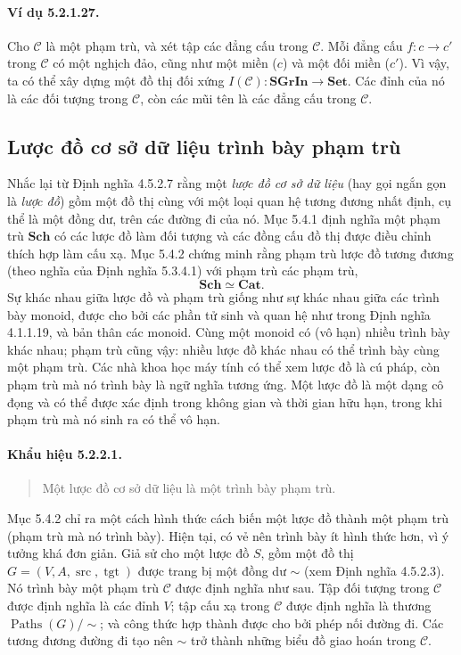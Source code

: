 \paragraph{Ví dụ 5.2.1.27.} Cho $\mathcal C$ là một phạm trù, và xét tập các đẳng cấu trong $\mathcal C$. Mỗi đẳng cấu $f:c\to c'$ trong $\mathcal C$ có một nghịch đảo, cũng như một miền ($c$) và một đối miền ($c'$). Vì vậy, ta có thể xây dựng một đồ thị đối xứng $I(\mathcal C):\mathbf{SGrIn}\to\mathbf{Set}$. Các đỉnh của nó là các đối tượng trong $\mathcal C$, còn các mũi tên là các đẳng cấu trong $\mathcal C$.
\subsection{Lược đồ cơ sở dữ liệu trình bày phạm trù}
Nhắc lại từ Định nghĩa 4.5.2.7 rằng một \emph{lược đồ cơ sở dữ liệu} (hay gọi ngắn gọn là \emph{lược đồ}) gồm một đồ thị cùng với một loại quan hệ tương đương nhất định, cụ thể là một đồng dư, trên các đường đi của nó. Mục 5.4.1 định nghĩa một phạm trù $\mathbf{Sch}$ có các lược đồ làm đối tượng và các đồng cấu đồ thị được điều chỉnh thích hợp làm cấu xạ. Mục 5.4.2 chứng minh rằng phạm trù lược đồ tương đương (theo nghĩa của Định nghĩa 5.3.4.1) với phạm trù các phạm trù,
\[\mathbf{Sch}\simeq\mathbf{Cat}.\]
Sự khác nhau giữa lược đồ và phạm trù giống như sự khác nhau giữa các trình bày monoid, được cho bởi các phần tử sinh và quan hệ như trong Định nghĩa 4.1.1.19, và bản thân các monoid. Cùng một monoid có (vô hạn) nhiều trình bày khác nhau; phạm trù cũng vậy: nhiều lược đồ khác nhau có thể trình bày cùng một phạm trù. Các nhà khoa học máy tính có thể xem lược đồ là cú pháp, còn phạm trù mà nó trình bày là ngữ nghĩa tương ứng. Một lược đồ là một dạng cô đọng và có thể được xác định trong không gian và thời gian hữu hạn, trong khi phạm trù mà nó sinh ra có thể vô hạn.
\paragraph{Khẩu hiệu 5.2.2.1.}\begin{quote}Một lược đồ cơ sở dữ liệu là một trình bày phạm trù.\end{quote}
Mục 5.4.2 chỉ ra một cách hình thức cách biến một lược đồ thành một phạm trù (phạm trù mà nó trình bày). Hiện tại, có vẻ nên trình bày ít hình thức hơn, vì ý tưởng khá đơn giản. Giả sử cho một lược đồ $S$, gồm một đồ thị $G=(V,A,\operatorname{src},\operatorname{tgt})$ được trang bị một đồng dư $\sim$ (xem Định nghĩa 4.5.2.3). Nó trình bày một phạm trù $\mathcal C$ được định nghĩa như sau. Tập đối tượng trong $\mathcal C$ được định nghĩa là các đỉnh $V$; tập cấu xạ trong $\mathcal C$ được định nghĩa là thương $\operatorname{Paths}(G)/\sim$; và công thức hợp thành được cho bởi phép nối đường đi. Các tương đương đường đi tạo nên $\sim$ trở thành những biểu đồ giao hoán trong $\mathcal C$.
